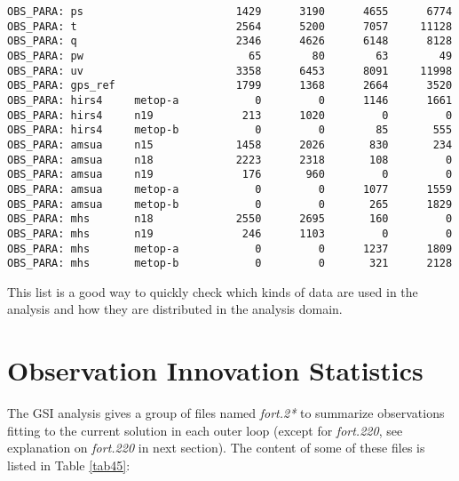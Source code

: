 \begin{scriptsize}
\begin{verbatim}
OBS_PARA: ps                        1429      3190      4655      6774
OBS_PARA: t                         2564      5200      7057     11128
OBS_PARA: q                         2346      4626      6148      8128
OBS_PARA: pw                          65        80        63        49
OBS_PARA: uv                        3358      6453      8091     11998
OBS_PARA: gps_ref                   1799      1368      2664      3520
OBS_PARA: hirs4     metop-a            0         0      1146      1661
OBS_PARA: hirs4     n19              213      1020         0         0
OBS_PARA: hirs4     metop-b            0         0        85       555
OBS_PARA: amsua     n15             1458      2026       830       234
OBS_PARA: amsua     n18             2223      2318       108         0
OBS_PARA: amsua     n19              176       960         0         0
OBS_PARA: amsua     metop-a            0         0      1077      1559
OBS_PARA: amsua     metop-b            0         0       265      1829
OBS_PARA: mhs       n18             2550      2695       160         0
OBS_PARA: mhs       n19              246      1103         0         0
OBS_PARA: mhs       metop-a            0         0      1237      1809
OBS_PARA: mhs       metop-b            0         0       321      2128
\end{verbatim}
\end{scriptsize}

This list is a good way to quickly check which kinds of data are used in the analysis and how they are distributed in the analysis domain.


\section{Observation Innovation Statistics}

The GSI analysis gives a group of files named \textit{fort.2*} to summarize observations fitting to the current solution in each outer loop (except for \textit{fort.220}, see explanation on \textit{fort.220} in next section). The content of some of these files is listed in Table \ref{tab45}:

